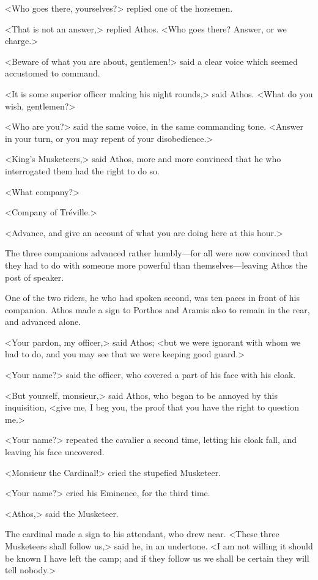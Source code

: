 <Who goes there, yourselves?> replied one of the horsemen. 

<That is not an answer,> replied Athos. <Who goes there? Answer, or we charge.> 

<Beware of what you are about, gentlemen!> said a clear voice which seemed accustomed to command. 

<It is some superior officer making his night rounds,> said Athos. <What do you wish, gentlemen?> 

<Who are you?> said the same voice, in the same commanding tone. <Answer in your turn, or you may repent of your disobedience.> 

<King's Musketeers,> said Athos, more and more convinced that he who interrogated them had the right to do so. 

<What company?> 

<Company of Tréville.> 

<Advance, and give an account of what you are doing here at this hour.> 

The three companions advanced rather humbly---for all were now convinced that they had to do with someone more powerful than themselves---leaving Athos the post of speaker. 

One of the two riders, he who had spoken second, was ten paces in front of his companion. Athos made a sign to Porthos and Aramis also to remain in the rear, and advanced alone. 

<Your pardon, my officer,> said Athos; <but we were ignorant with whom we had to do, and you may see that we were keeping good guard.> 

<Your name?> said the officer, who covered a part of his face with his cloak. 

<But yourself, monsieur,> said Athos, who began to be annoyed by this inquisition, <give me, I beg you, the proof that you have the right to question me.> 

<Your name?> repeated the cavalier a second time, letting his cloak fall, and leaving his face uncovered. 

<Monsieur the Cardinal!> cried the stupefied Musketeer. 

<Your name?> cried his Eminence, for the third time. 

<Athos,> said the Musketeer. 

The cardinal made a sign to his attendant, who drew near. <These three Musketeers shall follow us,> said he, in an undertone. <I am not willing it should be known I have left the camp; and if they follow us we shall be certain they will tell nobody.> 

